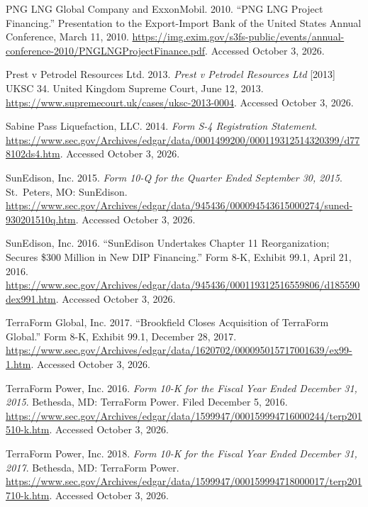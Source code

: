 \begin{sources}
\item PNG LNG Global Company and ExxonMobil. 2010. ``PNG LNG Project Financing.'' Presentation to the Export-Import Bank of the United States Annual Conference, March 11, 2010. \url{https://img.exim.gov/s3fs-public/events/annual-conference-2010/PNGLNGProjectFinance.pdf}. Accessed October 3, 2026.
\item Prest v Petrodel Resources Ltd. 2013. \textit{Prest v Petrodel Resources Ltd} [2013] UKSC 34. United Kingdom Supreme Court, June 12, 2013. \url{https://www.supremecourt.uk/cases/uksc-2013-0004}. Accessed October 3, 2026.
\item Sabine Pass Liquefaction, LLC. 2014. \textit{Form S-4 Registration Statement}. \url{https://www.sec.gov/Archives/edgar/data/0001499200/000119312514320399/d778102ds4.htm}. Accessed October 3, 2026.
\item SunEdison, Inc. 2015. \textit{Form 10-Q for the Quarter Ended September 30, 2015}. St.\ Peters, MO: SunEdison. \url{https://www.sec.gov/Archives/edgar/data/945436/000094543615000274/suned-930201510q.htm}. Accessed October 3, 2026.
\item SunEdison, Inc. 2016. ``SunEdison Undertakes Chapter 11 Reorganization; Secures \$300 Million in New DIP Financing.'' Form 8-K, Exhibit 99.1, April 21, 2016. \url{https://www.sec.gov/Archives/edgar/data/945436/000119312516559806/d185590dex991.htm}. Accessed October 3, 2026.
\item TerraForm Global, Inc. 2017. ``Brookfield Closes Acquisition of TerraForm Global.'' Form 8-K, Exhibit 99.1, December 28, 2017. \url{https://www.sec.gov/Archives/edgar/data/1620702/000095015717001639/ex99-1.htm}. Accessed October 3, 2026.
\item TerraForm Power, Inc. 2016. \textit{Form 10-K for the Fiscal Year Ended December 31, 2015}. Bethesda, MD: TerraForm Power. Filed December 5, 2016. \url{https://www.sec.gov/Archives/edgar/data/1599947/000159994716000244/terp201510-k.htm}. Accessed October 3, 2026.
\item TerraForm Power, Inc. 2018. \textit{Form 10-K for the Fiscal Year Ended December 31, 2017}. Bethesda, MD: TerraForm Power. \url{https://www.sec.gov/Archives/edgar/data/1599947/000159994718000017/terp201710-k.htm}. Accessed October 3, 2026.
\end{sources}
